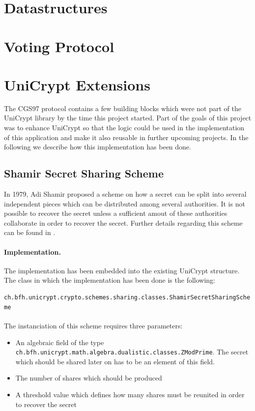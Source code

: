 \documentclass[numbers=noenddot, abstract=on, a4paper, headsepline,
footsepline, oneside, draft=off]{scrreprt}
\begin{document}
\section{Datastructures}
\label{sec:datastructures}

\section{Voting Protocol}
\label{sec:votingprotocol}


\section{UniCrypt Extensions}
\label{sec:enhancmentsunicrypt}
The CGS97 protocol contains a few building blocks which were not part of the
UniCrypt library by the time this project started. Part of the goals of this
project was to enhance UniCrypt so that the logic could be used in the
implementation of this application and make it also reusable in further upcoming
projects. In the following we describe how this implementation has been done.

\subsection{Shamir Secret Sharing Scheme}
In 1979, Adi Shamir proposed a scheme \cite{Shamir79} on how a secret can be
split into several independent pieces which can be distributed among several
authorities. It is not possible to recover the secret unless a sufficient amout
of these authorities collaborate in order to recover the secret. Further details
regarding this scheme can be found in .

\paragraph{Implementation.} The implementation has been embedded into the
existing UniCrypt structure.
The class in which the implementation has been done is the following:

\texttt{ch.bfh.unicrypt.crypto.schemes.sharing.classes.ShamirSecretSharingScheme}
\\
\\
The instanciation of this scheme requires three parameters:
\begin{itemize}
  \item An algebraic field of the type \\
  \texttt{ch.bfh.unicrypt.math.algebra.dualistic.classes.ZModPrime}. The secret
  which should be shared later on has to be an element of this field.
  \item The number of shares which should be produced
  \item A threshold value which defines how many shares must be reunited in
  order to recover the secret
\end{itemize}
\end{document}
